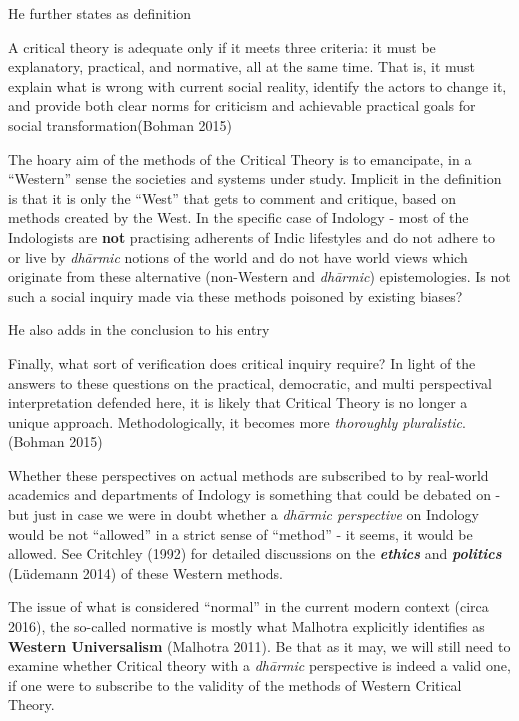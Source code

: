 He further states as definition
\begin{myquote}
A critical theory is adequate only if it meets three criteria: it must be explanatory, practical, and normative, all at the same time. That is, it must explain what is wrong with current social reality, identify the actors to change it, and provide both clear norms for criticism and achievable practical goals for social transformation\hfill (Bohman 2015)
\end{myquote}

The hoary aim of the methods of the Critical Theory is to emancipate, in a ``Western'' sense the societies and systems under study. Implicit in the definition is that it is only the ``West'' that gets to comment and critique, based on methods created by the West. In the specific case of Indology - most of the Indologists are {\bf not} practising adherents of Indic lifestyles and do not adhere to or live by {\sl dhārmic} notions of the world and do not have world views which originate from these alternative (non-Western and {\sl dhārmic}) epistemologies. Is not such a social inquiry made via these methods poisoned by existing biases?

He also adds in the conclusion to his entry
\begin{myquote}
Finally, what sort of verification does critical inquiry require? In light of the answers to these questions on the practical, democratic, and multi perspectival interpretation defended here, it is likely that Critical Theory is no longer a unique approach. Methodologically, it becomes more {\sl thoroughly pluralistic}.\hfill (Bohman 2015)
\end{myquote}

Whether these perspectives on actual methods are subscribed to by real-world  academics and departments of Indology is something that could be debated on - but just in case we were in doubt whether a {\sl dhārmic perspective} on Indology would be  not ``allowed'' in a strict sense of ``method'' - it seems, it would be allowed. See Critchley (1992) for detailed discussions on the {{\sl\bfseries ethics}\relax} and {{\sl\bfseries politics}\relax} (Lüdemann 2014) of these Western methods.

The issue of what is considered ``normal'' in the current modern context (circa 2016), the so-called normative is mostly what Malhotra explicitly identifies as {\bf Western Universalism} (Malhotra 2011). Be that as it may, we will still need to examine whether Critical theory with a {\sl dhārmic} perspective is indeed a valid one, if one were to subscribe to the validity of the methods of Western Critical Theory.

